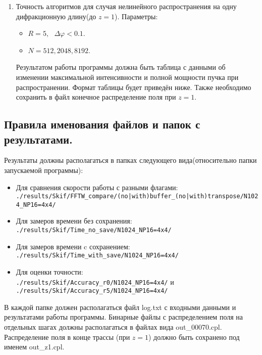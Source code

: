 \begin{enumerate}
	\item Точность алгоритмов для случая нелинейного распространения на одну дифракционную длину(до $z=1$). Параметры:
		\begin{itemize}
			\item $R = 5,\text{ }\Delta\varphi < 0.1$.
			\item $N = 512, 2048, 8192$.
		\end{itemize}
		Результатом работы программы должна быть таблица с данными об изменении максимальной интенсивности
		и полной мощности пучка при распространении. Формат таблицы будет приведён ниже.
		Также необходимо сохранить в файл конечное распределение поля при $z=1$.
\end{enumerate}


\subsection{Правила именования файлов и папок с результатами.}
Результаты должны располагаться в папках следующего вида(относительно папки запускаемой программы):
\begin{itemize}
	\item Для сравнения скорости работы {\fftw} с разными флагами: \\
		\texttt{./results/Skif/FFTW\_compare/(no|with)buffer\_(no|with)transpose/N1024\_NP16=4x4/}
	\item Для замеров времени без сохранения: \\
		\texttt{./results/Skif/Time\_no\_save/N1024\_NP16=4x4/}
	\item Для замеров времени c сохранением: \\
		\texttt{./results/Skif/Time\_with\_save/N1024\_NP16=4x4/}
	\item Для оценки точности: \\
		\texttt{./results/Skif/Accuracy\_r0/N1024\_NP16=4x4/} и \\
		\texttt{./results/Skif/Accuracy\_r5/N1024\_NP16=4x4/}
\end{itemize}
В каждой папке должен располагаться файл log.txt с входными данными и результатами работы программы. Бинарные файлы с распределением поля на отдельных шагах должны располагаться в файлах вида out\_00070.cpl. Распределение поля в конце трассы (при $z=1$) должно быть сохранено под именем out\_z1.cpl.


